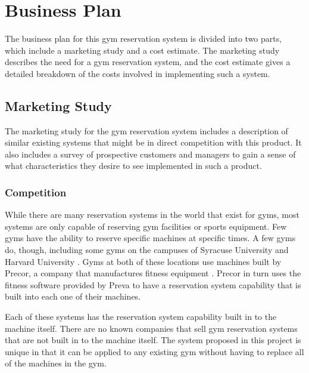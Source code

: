 \documentclass[PPFS.tex]{template/subfiles}
\begin{document}
\section{Business Plan}

The business plan for this gym reservation system is divided into two parts, which include a marketing study and a cost estimate. The marketing study describes the need for a gym reservation system, and the cost estimate gives a detailed breakdown of the costs involved in implementing such a system.

    \subsection{Marketing Study}
    
    The marketing study for the gym reservation system includes a description of similar existing systems that might be in direct competition with this product. It also includes a survey of prospective customers and managers to gain a sense of what characteristics they desire to see implemented in such a product.
    
        \subsubsection{Competition}
        
        While there are many reservation systems in the world that exist for gyms, most systems are only capable of reserving gym facilities or sports equipment. Few gyms have the ability to reserve specific machines at specific times. A few gyms do, though, including some gyms on the campuses of Syracuse University \cite{Syracuse} and Harvard University \cite{Harvard}. Gyms at both of these locations use machines built by Precor, a company that manufactures fitness equipment \cite{Precor}. Precor in turn uses the fitness software provided by Preva \cite{Preva} to have a reservation system capability that is built into each one of their machines.
        
        Each of these systems has the reservation system capability built in to the machine itself. There are no known companies that sell gym reservation systems that are not built in to the machine itself. The system proposed in this project is unique in that it can be applied to any existing gym without having to replace all of the machines in the gym.
        
\end{document}
